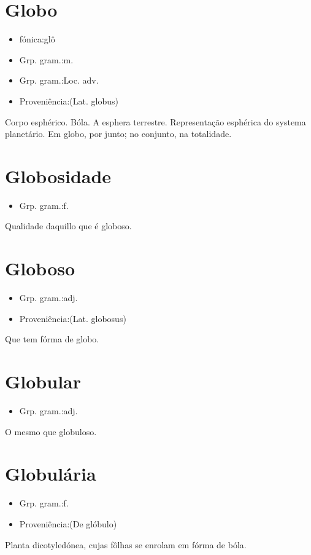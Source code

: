 \section{Globo}
\begin{itemize}
\item {fónica:glô}
\end{itemize}
\begin{itemize}
\item {Grp. gram.:m.}
\end{itemize}
\begin{itemize}
\item {Grp. gram.:Loc. adv.}
\end{itemize}
\begin{itemize}
\item {Proveniência:(Lat. \textunderscore globus\textunderscore )}
\end{itemize}
Corpo esphérico.
Bóla.
A esphera terrestre.
Representação esphérica do systema planetário.
\textunderscore Em globo\textunderscore , por junto; no conjunto, na totalidade.
\section{Globosidade}
\begin{itemize}
\item {Grp. gram.:f.}
\end{itemize}
Qualidade daquillo que é globoso.
\section{Globoso}
\begin{itemize}
\item {Grp. gram.:adj.}
\end{itemize}
\begin{itemize}
\item {Proveniência:(Lat. \textunderscore globosus\textunderscore )}
\end{itemize}
Que tem fórma de globo.
\section{Globular}
\begin{itemize}
\item {Grp. gram.:adj.}
\end{itemize}
O mesmo que \textunderscore globuloso\textunderscore .
\section{Globulária}
\begin{itemize}
\item {Grp. gram.:f.}
\end{itemize}
\begin{itemize}
\item {Proveniência:(De \textunderscore glóbulo\textunderscore )}
\end{itemize}
Planta dicotyledónea, cujas fôlhas se enrolam em fórma de bóla.
